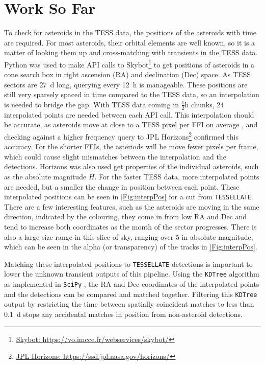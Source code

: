 \documentclass[12pt]{article}
\begin{document}
\section{Work So Far}

To check for asteroids in the TESS data, the positions of the asteroids with time are required.
For most asteroids, their orbital elements are well known, so it is a matter of looking them up and cross-matching with transients in the TESS data.
Python was used to make API calls to {Skybot}\footnote{\href{https://vo.imcce.fr/webservices/skybot/}{Skybot: https://vo.imcce.fr/webservices/skybot/}} to get positions of asteroids in a cone search box in right ascension (RA) and  declination (Dec) space.
As TESS sectors are \qty{27}{\day} long, querying every \qty{12}{\hour} is manageable.
These positions are still very sparsely spaced in time compared to the TESS data, so an interpolation is needed to bridge the gap.
With TESS data coming in $\frac12\unit{\hour}$ chunks, 24 interpolated points are needed between each API call.
This interpolation should be accurate, as asteroids move at close to a TESS pixel per FFI on average \citep{Pal2018,Pal2020}, and checking against a higher frequency query to {JPL Horizons}\footnote{\href{https://ssd.jpl.nasa.gov/horizons/}{JPL Horizons: https://ssd.jpl.nasa.gov/horizons/}} confirmed this accuracy.
For the shorter FFIs, the asteriods will be move fewer pixels per frame, which could cause slight mismatches between the interpolation and the detections. 
Horizons was also used get properties of the individual asteroids, such as the absolute magnitude $H$. 
For the faster TESS data, more interpolated points are needed, but a smaller the change in position between each point.
These interpolated positions can be seen in \autoref{Fig:interpPos} for a cut from \texttt{TESSELLATE}. 
There are a few interesting features, such as the asteroids are moving in the same direction, indicated by the colouring, they come in from low RA and Dec and tend to increase both coordinates as the month of the sector progresses. 
There is also a large size range in this slice of sky, ranging over \qty{5}{\mag} in absolute magnitude, which can be seen in the alpha (or transparency) of the tracks in \autoref{Fig:interpPos}. 

Matching these interpolated positions to \texttt{TESSELLATE} detections is important to lower the unknown transient outputs of this pipeline. 
Using the \texttt{KDTree} algorithm \citep{Maneewongvatana1999} as implemented in \texttt{SciPy} \citep{2020SciPy-NMeth}, the RA and Dec coordinates of the interpolated points and the detections can be compared and matched together. 
Filtering this \texttt{KDTree} output by restricting the time between spatially coincident matches to less than \qty{0.1}{\day} stops any accidental matches in position from non-asteroid detections. 
    
\end{document}
